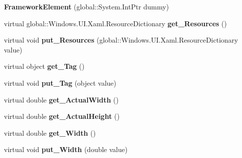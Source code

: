 \begin{DoxyCompactItemize}
{\bfseries Framework\+Element} (global\+::\+System.\+Int\+Ptr dummy)
\item 
\mbox{\label{class_windows_1_1_u_i_1_1_xaml_1_1_framework_element_a933790d636d5d0e5dffc0eeccfea0e49}} 
virtual global\+::\+Windows.\+U\+I.\+Xaml.\+Resource\+Dictionary {\bfseries get\+\_\+\+Resources} ()
\item 
\mbox{\label{class_windows_1_1_u_i_1_1_xaml_1_1_framework_element_a203f639c05e0324e1d6c6eac84b913bb}} 
virtual void {\bfseries put\+\_\+\+Resources} (global\+::\+Windows.\+U\+I.\+Xaml.\+Resource\+Dictionary value)
\item 
\mbox{\label{class_windows_1_1_u_i_1_1_xaml_1_1_framework_element_ab65e3451cf2788c7a6f3e371c6713c95}} 
virtual object {\bfseries get\+\_\+\+Tag} ()
\item 
\mbox{\label{class_windows_1_1_u_i_1_1_xaml_1_1_framework_element_ac5e489cfe8d78a833e14d85301344eff}} 
virtual void {\bfseries put\+\_\+\+Tag} (object value)
\item 
\mbox{\label{class_windows_1_1_u_i_1_1_xaml_1_1_framework_element_a694d845ee3ba82db8477d93cf3195457}} 
virtual double {\bfseries get\+\_\+\+Actual\+Width} ()
\item 
\mbox{\label{class_windows_1_1_u_i_1_1_xaml_1_1_framework_element_a4b30157662f4b1516d4e21297a591188}} 
virtual double {\bfseries get\+\_\+\+Actual\+Height} ()
\item 
\mbox{\label{class_windows_1_1_u_i_1_1_xaml_1_1_framework_element_af41531ee60692baab5862c9a7d5cfa81}} 
virtual double {\bfseries get\+\_\+\+Width} ()
\item 
\mbox{\label{class_windows_1_1_u_i_1_1_xaml_1_1_framework_element_a9f5305e5ef018d2e6685349eb7294ee1}} 
virtual void {\bfseries put\+\_\+\+Width} (double value)
\item 

\end{DoxyCompactItemize}
